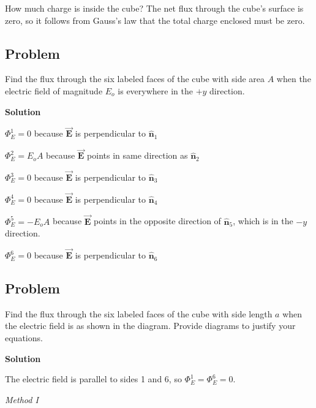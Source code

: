 \documentclass{article}
\newcommand{\bfvec}[1]{\vec{\mathbf{#1}}}
\begin{document}
How much charge is inside the cube? The net flux through the cube's surface is zero, so it follows from Gauss's law that the total charge enclosed must be zero.

\ifsolutions

\else

\newpage
\fi

\subsection{Problem}



Find the flux through the six labeled faces of the cube with side area $A$ when the electric field of magnitude $E_o$ is everywhere in the $+y$ direction.

\ifsolutions
\textbf{Solution}

$\Phi_E^1=0$ because $\bfvec{E}$ is perpendicular to $\hat{\mathbf{n}}_1$

$\Phi_E^2=E_oA$ because $\bfvec{E}$ points in same direction as $\hat{\mathbf{n}}_2$

$\Phi_E^3=0$ because $\bfvec{E}$ is perpendicular to $\hat{\mathbf{n}}_3$

$\Phi_E^4=0$ because $\bfvec{E}$ is perpendicular to $\hat{\mathbf{n}}_4$

$\Phi_E^5=-E_oA$ because $\bfvec{E}$ points in the opposite direction of $\hat{\mathbf{n}}_5$, which is in the $-y$ direction.

$\Phi_E^6=0$ because $\bfvec{E}$ is perpendicular to $\hat{\mathbf{n}}_6$
\else

\newpage
\fi

\subsection{Problem}



Find the flux through the six labeled faces of the cube with side length $a$ when the electric field is as shown in the diagram. Provide diagrams to justify your equations.

\ifsolutions
\textbf{Solution}

The electric field is parallel to sides 1 and 6, so $\Phi_E^1=\Phi_E^6=0$.

\emph{Method I}


\end{document}
